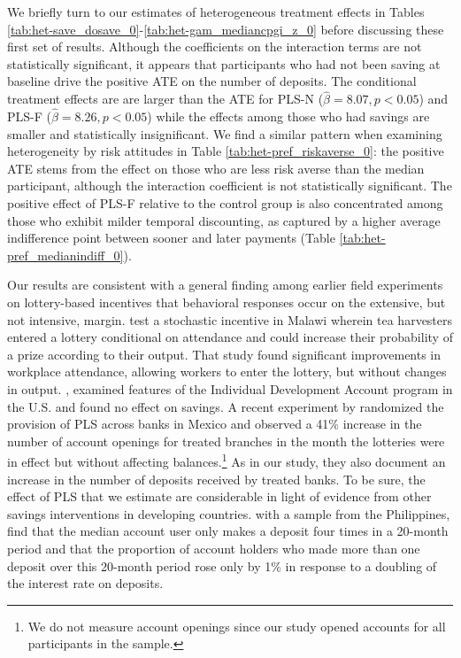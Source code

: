 \documentclass[11pt]{article}
\begin{document}
		

		We briefly turn to our estimates of heterogeneous treatment effects in Tables \ref{tab:het-save_dosave_0}-\ref{tab:het-gam_mediancpgi_z_0} before discussing these first set of results. Although the coefficients on the interaction terms are not statistically significant, it appears that participants who had not been saving at baseline drive the positive ATE on the number of deposits. The conditional treatment effects are are larger than the ATE for PLS-N ($\hat \beta = 8.07, p < 0.05$) and PLS-F ($\hat \beta = 8.26, p <0.05$) while the effects among those who had savings are smaller and statistically insignificant. We find a similar pattern when examining heterogeneity by risk attitudes in Table \ref{tab:het-pref_riskaverse_0}: the positive ATE stems from the effect on those who are less risk averse than the median participant, although the interaction coefficient is not statistically significant. The positive effect of PLS-F relative to the control group is also concentrated among those who exhibit milder temporal discounting, as captured by a higher average indifference point between sooner and later payments (Table \ref{tab:het-pref_medianindiff_0}).

		Our results are consistent with a general finding among earlier field experiments on lottery-based incentives that behavioral responses occur on the extensive, but not intensive, margin. \textcite{brune_effect_2015} test a stochastic incentive in Malawi wherein tea harvesters entered a lottery conditional on attendance and could increase their probability of a prize according to their output. That study found significant improvements in workplace attendance, allowing workers to enter the lottery, but without changes in output. \textcite{loibl_testing_2016}, examined features of the Individual Development Account program in the U.S. and found no effect on savings. A recent experiment by \textcite{gertler_long-term_2017} randomized the provision of PLS across banks in Mexico and observed a 41\% increase in the number of account openings for treated branches in the month the lotteries were in effect but without affecting balances.\footnote{We do not measure account openings since our study opened accounts for all participants in the sample.} As in our study, they also document an increase in the number of deposits received by treated banks. To be sure, the effect of PLS that we estimate are considerable in light of evidence from other savings interventions in developing countries. \textcite{karlan_price_2018} with a sample from the Philippines, find that the median account user only makes a deposit four times in a 20-month period and that the proportion of account holders who made more than one deposit over this 20-month period rose only by 1\% in response to a doubling of the interest rate on deposits.
\end{document}

